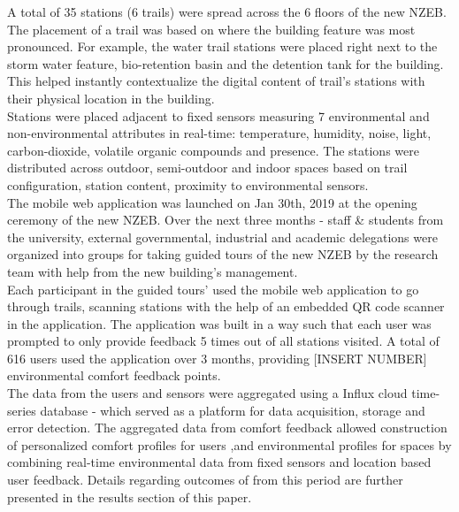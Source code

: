 
A total of 35 stations (6 trails) were spread across the 6 floors of the new NZEB. The placement of a trail was based on where the building feature was most pronounced. For example, the water trail stations were placed right next to the storm water feature, bio-retention basin and the detention tank for the building. This helped instantly contextualize the digital content of trail's stations with their physical location in the building.\\

Stations were placed adjacent to fixed sensors measuring 7 environmental and non-environmental attributes in real-time: temperature, humidity, noise, light, carbon-dioxide, volatile organic compounds and presence. The stations were distributed across outdoor, semi-outdoor and indoor spaces based on trail configuration, station content, proximity to environmental sensors.\\

The mobile web application was launched on Jan 30th, 2019 at the opening ceremony of the new NZEB. Over the next three months - staff \& students from the university, external governmental, industrial and academic delegations were organized into groups for taking guided tours of the new NZEB by the research team with help from the new building's management.\\

Each participant in the guided tours' used the mobile web application to go through trails, scanning stations with the help of an embedded QR code scanner in the application. The application was built in a way such that each user was prompted to only provide feedback 5 times out of all stations visited. A total of 616 users used the application over 3 months, providing [INSERT NUMBER] environmental comfort feedback points.\\

The data from the users and sensors were aggregated using a Influx cloud time-series database - which served as a platform for data acquisition, storage and error detection. The aggregated data from comfort feedback allowed construction of personalized comfort profiles for users ,and environmental profiles for spaces by combining real-time environmental data from fixed sensors and location based user feedback. Details regarding outcomes of from this period are further presented in the results section of this paper.\\



